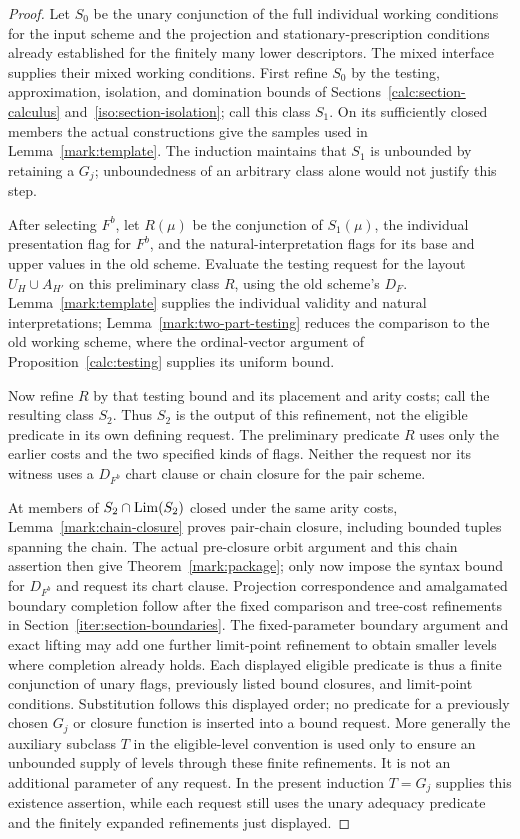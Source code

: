 \begin{proof}
Let $S_0$ be the
unary conjunction of the full individual working conditions for the
input scheme and the projection and stationary-prescription conditions
already established for the finitely many lower descriptors.  The mixed
interface supplies their mixed working conditions.  First refine $S_0$
by the testing, approximation, isolation, and domination bounds of
Sections~\ref{calc:section-calculus} and~\ref{iso:section-isolation};
call this class $S_1$.  On its sufficiently closed members the actual
constructions give the samples used in Lemma~\ref{mark:template}.
The induction maintains that $S_1$ is unbounded by retaining a $G_j$;
unboundedness of an arbitrary class alone would not justify this step.

After selecting $F^b$, let $R(\mu)$ be the conjunction of $S_1(\mu)$,
the individual presentation flag for $F^b$, and the natural-interpretation
flags for its base and upper values in the old scheme.  Evaluate the
testing request for the layout $U_H\cup A_{H'}$ on this preliminary
class $R$, using the old scheme's $D_F$.  Lemma~\ref{mark:template}
supplies the individual validity and natural interpretations;
Lemma~\ref{mark:two-part-testing} reduces the comparison to the old
working scheme, where the ordinal-vector argument of
Proposition~\ref{calc:testing} supplies its uniform bound.

Now refine $R$ by that testing bound and its placement and arity costs;
call the resulting class $S_2$.  Thus $S_2$ is the output of this
refinement, not the eligible predicate in its own defining request.
The preliminary predicate $R$ uses only the earlier costs and the two
specified kinds of flags.  Neither the request nor its witness uses
a $D_{F^b}$ chart clause or chain closure for the pair scheme.

At members of $S_2\cap\operatorname{Lim}(S_2)$ closed under the same arity costs,
Lemma~\ref{mark:chain-closure} proves pair-chain closure, including
bounded tuples spanning the chain.  The actual pre-closure orbit
argument and this chain assertion then give
Theorem~\ref{mark:package}; only now impose the syntax bound for
$D_{F^b}$ and request its chart clause.  Projection correspondence and
amalgamated boundary completion follow after the fixed comparison and
tree-cost refinements in Section~\ref{iter:section-boundaries}.
The fixed-parameter boundary argument and exact lifting may add one
further limit-point refinement to obtain smaller levels where
completion already holds.  Each displayed eligible predicate is thus
a finite conjunction of unary flags, previously listed bound closures,
and limit-point conditions.  Substitution follows this displayed order;
no predicate for a previously chosen $G_j$ or closure function is
inserted into a bound request.  More generally the auxiliary subclass
$T$ in the eligible-level convention is used only to ensure an
unbounded supply of levels through these finite refinements.  It is
not an additional parameter of any request.  In the present induction
$T=G_j$ supplies this existence assertion, while each request still
uses the unary adequacy predicate and the finitely expanded refinements
just displayed.


\end{proof}
